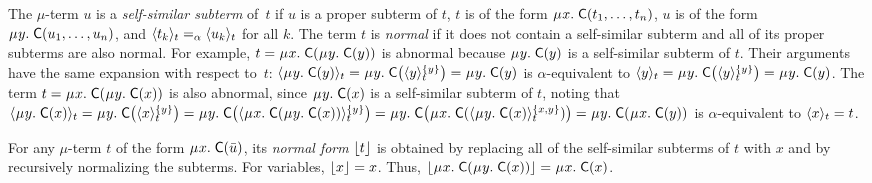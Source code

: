 The $\mu$-term $u$
is a \emph{self-similar subterm} of~$t$ if
$u$ is a proper subterm of $t$,
$t$ is of the form $\MU x.\; \const{C}( t_1, \ldots, t_n )$,
$u$ is of the form $\MU y.\; \const{C}( u_1, \ldots, u_n )$,
and $\expand{t}{ t_k } \aequiv \expand{t}{ u_k }$ for all $k$. %
The term $t$ is \emph{normal} if it does not contain a self-similar subterm
and all of its proper subterms are also normal.
For example, $t = \MU x.\; \const{C}( \MU y.\; \const{C}( y ) )$ is abnormal
because $\MU y.\; \const{C}( y )$ is a self-similar subterm of $t$.
Their arguments have the same expansion with respect to~$t$:
$\expand{t}{\MU y.\; \const{C}( y )} =
\MU y.\; \const{C}\bigl( \expand{t}{y}^{\smash{\{y\}}} \bigr) =
\MU y.\; \const{C}( y )$
is $\alpha$-equivalent to
$\expand{t}{y} =
\MU y.\; \const{C}\bigl( \expand{t}{y}^{\smash{\{y\}}} \bigr) =
\MU y.\; \const{C}( y )$.
The term $t = \MU x.\; \const{C}( \MU y.\; \const{C}( x ) )$ is also abnormal,
since $\MU y.\; \const{C}( x )$ is a self-similar subterm of $t$,
noting that
%
$\expand{t}{\MU y.\; \const{C}( x )}
 = \MU y.\; \const{C}\bigl( \expand{t}{x}^{\smash{\{y\}}} \bigr)
 = \MU y.\; \const{C}\bigl( \expand{t}{\MU x.\; \const{C}( \MU y.\; \const{C}( x ) ) }^{\smash{\{y\}}} \bigr)
 = \MU y.\; \const{C}\bigl( \MU x.\; \const{C}( \expand{t}{\MU y.\; \const{C}( x )}^{\smash{\{x,y\}}} ) \bigr)
 = \MU y.\allowbreak\; \const{C}( \MU x.\allowbreak\; \const{C}( y ) )$
is $\alpha$-equivalent to $\expand{t}{x} = t$.

For any $\mu$-term $t$ of the form $\MU x.\; \const C( \vec u )$,
its \emph{normal form} $\nf{t}$ is obtained
by replacing all of the self-similar subterms of $t$ with $x$
and by recursively normalizing the subterms.
For variables, $\nf{x} = x$.
Thus, $\nf{\MU x.\; \const{C}( \MU y.\; \const{C}( x ) )} = \MU x.\; \const{C}( x )$.

